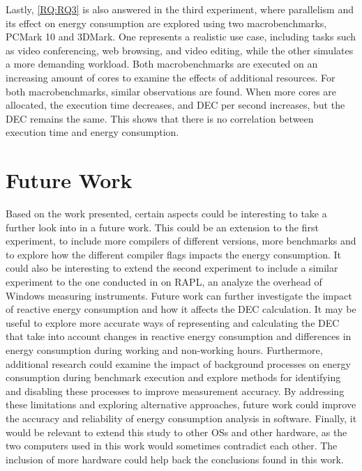 Lastly, \cref{RQ:RQ3} is also answered in the third experiment, where parallelism and its effect on energy consumption are explored using two macrobenchmarks, PCMark 10 and 3DMark. One represents a realistic use case, including tasks such as video conferencing, web browsing, and video editing, while the other simulates a more demanding workload. Both macrobenchmarks are executed on an increasing amount of cores to examine the effects of additional resources. For both macrobenchmarks, similar observations are found. When more cores are allocated, the execution time decreases, and DEC per second increases, but the DEC remains the same. This shows that there is no correlation between execution time and energy consumption.  


\section{Future Work}

Based on the work presented, certain aspects could be interesting to take a further look into in a future work. This could be an extension to the first experiment, to include more compilers of different versions, more benchmarks and to explore how the different compiler flags impacts the energy consumption. It could also be interesting to extend the second experiment to include a similar experiment to the one conducted in \cite{khan2018rapl} on RAPL, an analyze the overhead of Windows measuring instruments. Future work can further investigate the impact of reactive energy consumption and how it affects the DEC calculation. It may be useful to explore more accurate ways of representing and calculating the DEC that take into account changes in reactive energy consumption and differences in energy consumption during working and non-working hours. Furthermore, additional research could examine the impact of background processes on energy consumption during benchmark execution and explore methods for identifying and disabling these processes to improve measurement accuracy. By addressing these limitations and exploring alternative approaches, future work could improve the accuracy and reliability of energy consumption analysis in software. Finally, it would be relevant to extend this study to other OSs and other hardware, as the two computers used in this work would sometimes contradict each other. The inclusion of more hardware could help back the conclusions found in this work.

